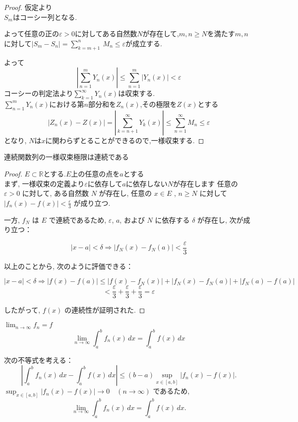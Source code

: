 \documentclass[12pt]{bxjsarticle}
\begin{document}
\begin{proof}
    
仮定より\\
$S_{m}$はコーシー列となる.

よって任意の正の$\varepsilon >0$に対してある自然数$N$が存在して,$m,n \geq N$を満たす$m,n$に対して$\left|S_{m}-S_{n}\right|= \displaystyle\sum_{k=m+1}^{n}\ M_{n} \leq \varepsilon $が成立する.

よって
\[\left|\displaystyle\sum_{n=1}^m Y_{n}(x)\right| \leq \sum_{n=1}^{m} \left|Y_{n}(x)\right| < \varepsilon\]
コーシーの判定法より$\displaystyle\sum_{k=1}^\infty Y_{n}(x)$は収束する.\\
$\displaystyle\sum_{n=1}^m Y_{n}(x)$における第$n$部分和を$Z_{n}(x)$,その極限を$Z(x)$とする\\
\[\left|Z_{n}(x)-Z(x)\right|=\left|\displaystyle\sum_{k=n+1}^\infty Y_{k}(x)\right| \leq \displaystyle\sum_{n=1}^\infty M_{n} \leq \varepsilon\]
となり, $N$は$x$に関わらずとることができるので,一様収束する.
\end{proof}
\begin{Lemma}
連続関数列の一様収束極限は連続である
\end{Lemma}
\begin{proof}
$E\subset \mathbb{R}$とする.$E$上の任意の点を$a$とする\\
まず, 一様収束の定義より$\varepsilon$に依存して$a$に依存しない$N$が存在します
任意の $\varepsilon > 0$ に対して, ある自然数 $N$ が存在し, 任意の $x \in E$ , $n \geq N$ に対して $\left| f_n(x) - f(x) \right| < \frac{\varepsilon}{3}$ が成り立つ.

一方, $f_N$ は $E$ で連続であるため, $\varepsilon$, $a$, および $N$ に依存する $\delta$ が存在し, 次が成り立つ：

\[
\left| x - a \right| < \delta \Rightarrow \left| f_N(x) - f_N(a) \right| < \frac{\varepsilon}{3}
\]

以上のことから, 次のように評価できる：

\[
\left| x - a \right| < \delta \Rightarrow \left| f(x) - f(a) \right| \leq \left| f(x) - f_N(x) \right| + \left| f_N(x) - f_N(a) \right| + \left| f_N(a) - f(a) \right|
\]
\[
< \frac{\varepsilon}{3} + \frac{\varepsilon}{3} + \frac{\varepsilon}{3} = \varepsilon
\]

したがって, $f(x)$ の連続性が証明された.
\end{proof}
\begin{Lemma}
$\lim_{n \to \infty} f_n = f$
\[\lim_{n \to \infty} \displaystyle \int_a^b f_n(x) \, dx = \displaystyle \int_a^b f(x) \, dx \]
\end{Lemma}
次の不等式を考える：
\[
\left| \int_a^b f_n(x) \, dx - \int_a^b f(x) \, dx \right| \leq (b-a) \sup_{x \in [a, b]} |f_n(x) - f(x)|.
\]
\(\sup_{x \in [a, b]} |f_n(x) - f(x)| \to 0 \quad (n \to \infty)\) であるため,
\[
\lim_{n \to \infty} \int_a^b f_n(x) \, dx = \int_a^b f(x) \, dx.
\]
\end{document}
